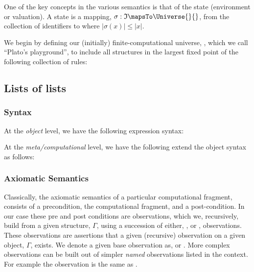 One of the key concepts in the various semantics is that of the state
(environment or valuation). A state is a mapping, $\sigma : \mathfrak{I} \mapsTo
\Universe{}{}$, from the collection of identifiers to \Universe{}{} where
$|\sigma(x)| \le |x|$.

We begin by defining our (initially) finite-computational universe,
\Universe{}{}, which we call ``Plato's playground'', to include all structures
in the largest fixed point of the following collection of rules:

\subsection{Lists of lists}

\subsubsection{Syntax}

At the \emph{object} level, we have the following expression syntax:

\begin{bnf*}\label{null-list}
\end{bnf*}

At the \emph{meta/computational} level, we have the following extend the object
syntax as follows:

\begin{bnf*}
\end{bnf*}

\subsubsection{Axiomatic Semantics}

Classically, the axiomatic semantics of a particular computational fragment,
consists of a precondition, the computational fragment, and a post-condition. In
our case these pre and post conditions are observations, which we, recursively,
build from a given structure, $\Gamma$, using a succession of either,
\car{\Gamma}, or \cdr{\Gamma}, observations. These observations are assertions
that a given (recursive) observation on a given object, $\Gamma$, exists. We
denote a given base observation as, \observation{\Gamma}{\cdot}{\car{\Gamma}} or
\observation{\Gamma}{\cdot}{\cdr{\Gamma}}. More complex observations can be
built out of simpler \emph{named} observations listed in the context. For
example the observation  is
the same as \observation{\Gamma}{\cdot}{\cdr{\car{\Gamma}}}.

